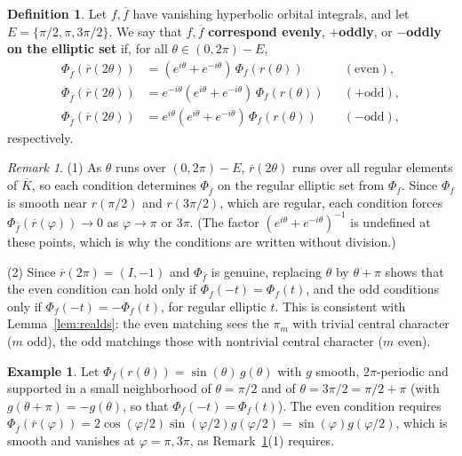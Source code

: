 \documentclass[12pt,letterpaper,openany]{book}
\theoremstyle{plain}
\theoremstyle{definition}
\newtheorem{definition}[theorem]{Definition}
\newtheorem{example}[theorem]{Example}
\theoremstyle{remark}
\newtheorem{remark}[theorem]{Remark}
\theoremstyle{remark}
\begin{document}
\begin{definition}\label{def:realds-corr}
Let $f,\overline{f}$ have vanishing hyperbolic orbital integrals, and let
$E=\{\pi/2,\pi,3\pi/2\}$. We say that $f,\overline f$
\textbf{correspond evenly}, \textbf{$+$oddly}, or \textbf{$-$oddly}
\textbf{on the elliptic set} if, for all $\theta\in(0,2\pi)-E$,
\begin{align*}
\Phi_{\overline{f}}(\overline{r}(2\theta ))
&=(e^{i\theta }+e^{-i\theta })\,\Phi_f(r(\theta )) &&(\mathrm{even}),\\
\Phi_{\overline{f}}(\overline{r}(2\theta ))
&=e^{-i\theta}(e^{i\theta }+e^{-i\theta })\,\Phi_f(r(\theta )) &&(+\mathrm{odd}),\\
\Phi_{\overline{f}}(\overline{r}(2\theta ))
&=e^{i\theta}(e^{i\theta }+e^{-i\theta })\,\Phi_f(r(\theta )) &&(-\mathrm{odd}),
\end{align*}
respectively.
\end{definition}

\begin{remark}\label{rem:realds-consistency}
(1) As $\theta$ runs over $(0,2\pi)-E$, $\overline r(2\theta)$ runs over
all regular elements of $\overline K$, so each condition determines
$\Phi_{\overline f}$ on the regular elliptic set from $\Phi_f$. Since
$\Phi_f$ is smooth near $r(\pi/2)$ and $r(3\pi/2)$, which are regular,
each condition forces $\Phi_{\overline f}(\overline r(\varphi))\rightarrow0$
as $\varphi\rightarrow\pi$ or $3\pi$. (The factor
$(e^{i\theta}+e^{-i\theta})^{-1}$ is undefined at these points, which is
why the conditions are written without division.)

(2) Since $\overline r(2\pi)=(I,-1)$ and $\Phi_{\overline f}$ is genuine,
replacing $\theta$ by $\theta+\pi$ shows that the even condition can hold
only if $\Phi_f(-t)=\Phi_f(t)$, and the odd conditions only if
$\Phi_f(-t)=-\Phi_f(t)$, for regular elliptic $t$. This is consistent
with Lemma~\ref{lem:realds}: the even matching sees the $\pi_m$ with
trivial central character ($m$ odd), the odd matchings those with
nontrivial central character ($m$ even).
\end{remark}

\begin{example}
Let $\Phi_f(r(\theta))=\sin(\theta)\,g(\theta)$ with $g$ smooth,
$2\pi$-periodic and supported in a small neighborhood of $\theta=\pi/2$
and of $\theta=3\pi/2=\pi/2+\pi$ (with $g(\theta+\pi)=-g(\theta)$, so that
$\Phi_f(-t)=\Phi_f(t)$). The even condition requires
$\Phi_{\overline f}(\overline r(\varphi))=2\cos(\varphi/2)\sin(\varphi/2)g(\varphi/2)
=\sin(\varphi)g(\varphi/2)$, which is smooth and vanishes at
$\varphi=\pi,3\pi$, as Remark~\ref{rem:realds-consistency}(1) requires.
\end{example}
\end{document}
